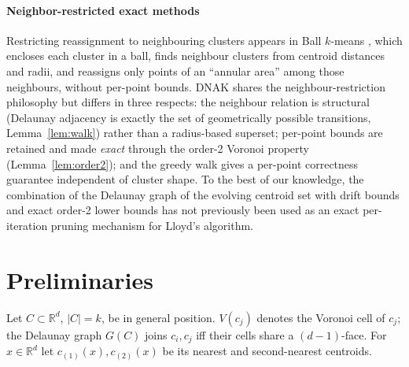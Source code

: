 \documentclass[review,12pt]{elsarticle}
\begin{document}
\paragraph{Neighbor-restricted exact methods}
Restricting reassignment to neighbouring clusters appears in Ball
$k$-means \cite{ballkmeans}, which encloses each cluster in a ball,
finds neighbour clusters from centroid distances and radii, and
reassigns only points of an ``annular area'' among those neighbours,
without per-point bounds. DNAK shares the neighbour-restriction
philosophy but differs in three respects: the neighbour relation is
structural (Delaunay adjacency is exactly the set of geometrically
possible transitions, Lemma~\ref{lem:walk}) rather than a radius-based
superset; per-point bounds are retained and made \emph{exact} through
the order-2 Voronoi property (Lemma~\ref{lem:order2}); and the greedy
walk gives a per-point correctness guarantee independent of cluster
shape. To the best of our knowledge, the combination of the Delaunay
graph of the evolving centroid set with drift bounds and exact order-2
lower bounds has not previously been used as an exact per-iteration
pruning mechanism for Lloyd's algorithm.

\section{Preliminaries}
\label{sec:prelim}

Let $C\subset\mathbb{R}^d$, $|C|=k$, be in general position. $V(c_j)$
denotes the Voronoi cell of $c_j$; the Delaunay graph $G(C)$ joins
$c_i,c_j$ iff their cells share a $(d-1)$-face. For $x\in\mathbb{R}^d$
let $c_{(1)}(x),c_{(2)}(x)$ be its nearest and second-nearest
centroids.
\end{document}
